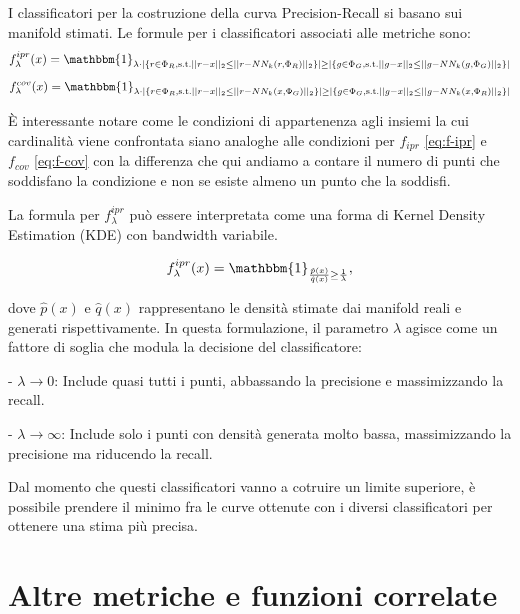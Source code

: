 I classificatori per la costruzione della curva Precision-Recall si basano sui manifold stimati. Le formule per i classificatori associati alle metriche sono:
\begin{equation}
    f_{\lambda}^{ipr}(x) = \mathbbm{1}_{\lambda \cdot |\{ r \in \Phi_R, \text{s.t.} ||r - x||_2 \leq ||r - NN_k(r, \Phi_R)||_2 \}| \geq |\{ g \in \Phi_G, \text{s.t.} ||g - x||_2 \leq ||g - NN_k(g, \Phi_G)||_2 \}|}
\end{equation}
\begin{equation}
    f_{\lambda}^{cov}(x) = \mathbbm{1}_{\lambda \cdot |\{ r \in \Phi_R, \text{s.t.} ||r - x||_2 \leq ||r - NN_k(x, \Phi_G)||_2 \}| \geq |\{ g \in \Phi_G, \text{s.t.} ||g - x||_2 \leq ||g - NN_k(x, \Phi_R)||_2 \}|}
\end{equation}

È interessante notare come le condizioni di appartenenza agli insiemi la cui cardinalità viene confrontata siano analoghe alle condizioni per \(f_{ipr}\) \ref{eq:f-ipr} e \(f_{cov}\) \ref{eq:f-cov} con la differenza che qui andiamo a contare il numero di punti che soddisfano la condizione e non se esiste almeno un punto che la soddisfi.

La formula per \(f_{\lambda}^{ipr}\) può essere interpretata come una forma di Kernel Density Estimation (KDE) con bandwidth variabile.

\begin{equation}
    f_{\lambda}^{ipr}(x) = \mathbbm{1}_{\frac{\hat{p}(x)}{\hat{q}(x)} \geq \frac{1}{\lambda}},
\end{equation}

dove \(\hat{p}(x)\) e \(\hat{q}(x)\) rappresentano le densità stimate dai manifold reali e generati rispettivamente. In questa formulazione, il parametro \(\lambda\) agisce come un fattore di soglia che modula la decisione del classificatore:  

- \(\lambda \to 0\): Include quasi tutti i punti, abbassando la precisione e massimizzando la recall.  

- \(\lambda \to \infty\): Include solo i punti con densità generata molto bassa, massimizzando la precisione ma riducendo la recall.

Dal momento che questi classificatori vanno a cotruire un limite superiore, è possibile prendere il minimo fra le curve ottenute con i diversi classificatori per ottenere una stima più precisa.

\section{Altre metriche e funzioni correlate}
\label{sec:altre-metriche}

